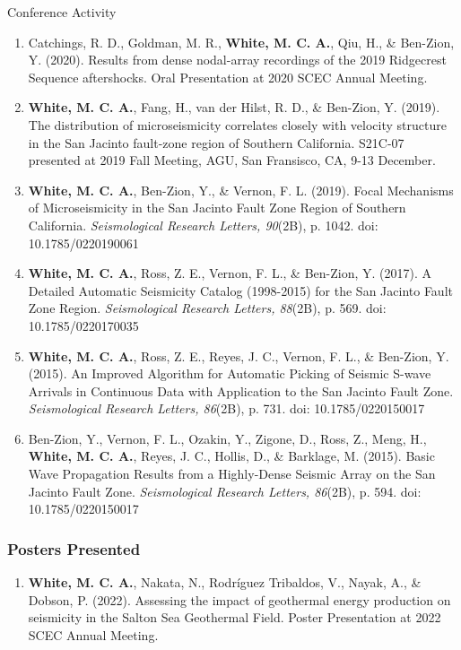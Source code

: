 \begin{rSection}{Conference Activity}
\begin{enumerate}
	
			\item Catchings, R. D., Goldman, M. R., \textbf{White, M. C. A.}, Qiu, H., \& Ben-Zion, Y. (2020). Results from dense nodal-array recordings of the 2019 Ridgecrest Sequence aftershocks. Oral Presentation at 2020 SCEC Annual Meeting.
	
			\item \textbf{White, M. C. A.}, Fang, H., van der Hilst, R. D., \& Ben-Zion, Y. (2019). The distribution of microseismicity correlates closely with velocity structure in the San Jacinto fault-zone region of Southern California. S21C-07 presented at 2019 Fall Meeting, AGU, San Fransisco, CA, 9-13 December.
			
			\item \textbf{White, M. C. A.}, Ben-Zion, Y., \& Vernon, F. L. (2019). Focal Mechanisms of Microseismicity in the San Jacinto Fault Zone Region of Southern California. \textit{Seismological Research Letters, 90}(2B), p. 1042. doi: 10.1785/0220190061
			
			\item \textbf{White, M. C. A.}, Ross, Z. E., Vernon, F. L., \& Ben-Zion, Y. (2017). A Detailed Automatic Seismicity Catalog (1998-2015) for the San Jacinto Fault Zone Region. \textit{Seismological Research Letters, 88}(2B), p. 569. doi: 10.1785/0220170035
			
			\item \textbf{White, M. C. A.}, Ross, Z. E., Reyes, J. C., Vernon, F. L., \& Ben-Zion, Y. (2015). An Improved Algorithm for Automatic Picking of Seismic S-wave Arrivals in Continuous Data with Application to the San Jacinto Fault Zone. \textit{Seismological Research Letters, 86}(2B), p. 731. doi: 10.1785/0220150017
			
			\item Ben-Zion, Y., Vernon, F. L., Ozakin, Y., Zigone, D., Ross, Z., Meng, H., \textbf{White, M. C. A.}, Reyes, J. C., Hollis, D., \& Barklage, M. (2015). Basic Wave Propagation Results from a Highly-Dense Seismic Array on the San Jacinto Fault Zone. \textit{Seismological Research Letters, 86}(2B), p. 594. doi: 10.1785/0220150017
		\end{enumerate}
	\subsubsection*{Posters Presented}
		\begin{enumerate}
			\item \textbf{White, M. C. A.}, Nakata, N., Rodríguez Tribaldos, V., Nayak, A., \& Dobson, P. (2022). Assessing the impact of geothermal energy production on seismicity in the Salton Sea Geothermal Field. Poster Presentation at 2022 SCEC Annual Meeting.
			

\end{enumerate}
\end{rSection}
